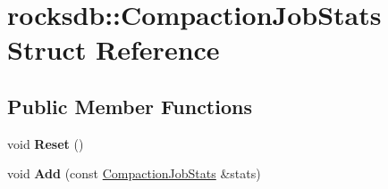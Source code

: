 \hypertarget{structrocksdb_1_1CompactionJobStats}{}\section{rocksdb\+:\+:Compaction\+Job\+Stats Struct Reference}
\label{structrocksdb_1_1CompactionJobStats}
\subsection*{Public Member Functions}
\begin{DoxyCompactItemize}
\item 
void {\bfseries Reset} ()\hypertarget{structrocksdb_1_1CompactionJobStats_af0195248906328fd3b8f27d55ae9425f}{}\label{structrocksdb_1_1CompactionJobStats_af0195248906328fd3b8f27d55ae9425f}

\item 
void {\bfseries Add} (const \hyperlink{structrocksdb_1_1CompactionJobStats}{Compaction\+Job\+Stats} \&stats)\hypertarget{structrocksdb_1_1CompactionJobStats_a3bc84f5f31d8281195c68255bc75cfc3}{}\label{structrocksdb_1_1CompactionJobStats_a3bc84f5f31d8281195c68255bc75cfc3}

\end{DoxyCompactItemize}
